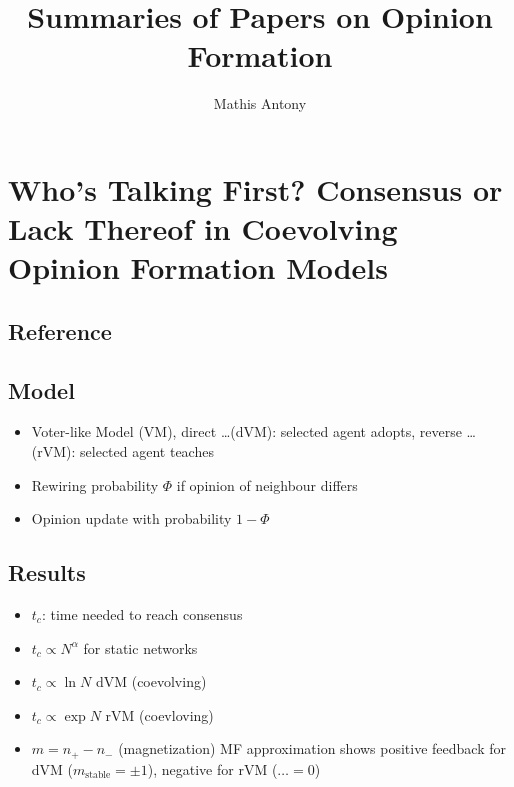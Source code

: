 \documentclass[a4paper]{scrartcl}
\begin{document}
\title{Summaries of Papers on Opinion Formation}
\author{Mathis Antony}
\maketitle
\tableofcontents
\section{Who's Talking First? Consensus or Lack Thereof in Coevolving Opinion
    Formation Models}
  \subsection{Reference}
  \subsection{Model}
    \begin{itemize}
      \item Voter-like Model (VM), direct \ldots (dVM): selected agent adopts,
        reverse \ldots (rVM): selected agent teaches
      \item Rewiring probability $\Phi$ if opinion of neighbour differs
      \item Opinion update with probability $1-\Phi$  
    \end{itemize}
  \subsection{Results}
    \begin{itemize}
      \item $t_c$: time needed to reach consensus
      \item $t_c \propto N^\alpha$ for static networks
      \item $t_c \propto \ln N$ dVM (coevolving)
      \item $t_c \propto \exp N$ rVM (coevloving)
      \item $m=n_+-n_-$ (magnetization) MF approximation shows positive
        feedback for dVM ($m_\textrm{stable}=\pm1$), negative for rVM
        ($\ldots=0$) 
    \end{itemize}

    


\end{document}
